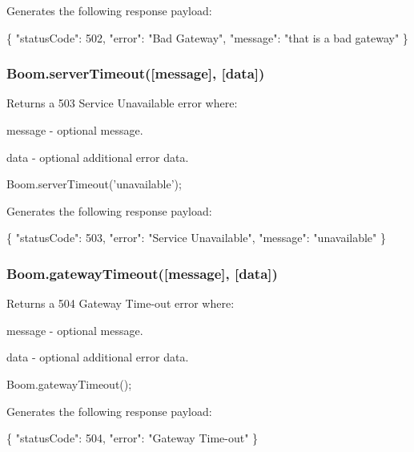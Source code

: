 Generates the following response payload\+:


\begin{DoxyCode}
\{
    "statusCode": 502,
    "error": "Bad Gateway",
    "message": "that is a bad gateway"
\}
\end{DoxyCode}


\subsubsection*{{\ttfamily Boom.\+server\+Timeout(\mbox{[}message\mbox{]}, \mbox{[}data\mbox{]})}}

Returns a 503 Service Unavailable error where\+:
\begin{DoxyItemize}
\item {\ttfamily message} -\/ optional message.
\item {\ttfamily data} -\/ optional additional error data.
\end{DoxyItemize}


\begin{DoxyCode}
Boom.serverTimeout('unavailable');
\end{DoxyCode}


Generates the following response payload\+:


\begin{DoxyCode}
\{
    "statusCode": 503,
    "error": "Service Unavailable",
    "message": "unavailable"
\}
\end{DoxyCode}


\subsubsection*{{\ttfamily Boom.\+gateway\+Timeout(\mbox{[}message\mbox{]}, \mbox{[}data\mbox{]})}}

Returns a 504 Gateway Time-\/out error where\+:
\begin{DoxyItemize}
\item {\ttfamily message} -\/ optional message.
\item {\ttfamily data} -\/ optional additional error data.
\end{DoxyItemize}


\begin{DoxyCode}
Boom.gatewayTimeout();
\end{DoxyCode}


Generates the following response payload\+:


\begin{DoxyCode}
\{
    "statusCode": 504,
    "error": "Gateway Time-out"
\}
\end{DoxyCode}


